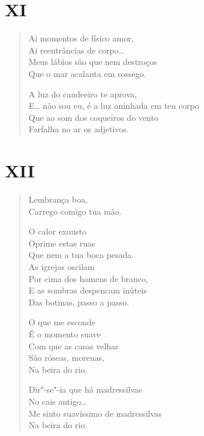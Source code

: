 \pagebreak
\section*{XI}

\begin{verse}
Ai momentos de físico amor,\\
Ai reentrâncias de corpo\ldots{}\\
Meus lábios são que nem destroços\\
Que o mar acalanta em sossego.

A luz do candeeiro te aprova,\\
E\ldots{} não sou eu, é a luz aninhada em teu corpo\\
Que ao som dos coqueiros do vento\\
Farfalha no ar os adjetivos.
\end{verse}

\pagebreak
\section*{XII}

\begin{verse}
Lembrança boa,\\
Carrego comigo tua mão.

O calor exausto\\
Oprime estas ruas\\
Que nem a tua boca pesada.\\
As igrejas oscilam\\
Por cima dos homens de branco,\\
E as sombras despencam inúteis\\
Das botinas, passo a passo.

O que me esconde\\
É o momento suave\\
Com que as casas velhas\\
São róseas, morenas,\\
Na beira do rio.

Dir"-se"-ia que há madressilvas\\
No cais antigo\ldots{}\\
Me sinto suavíssimo de madressilvas\\
Na beira do rio.
\end{verse}


